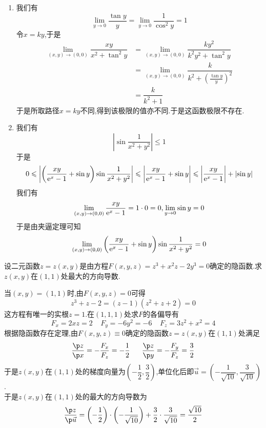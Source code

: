 \documentclass{ctexart}
\begin{document}
\begin{solution}
\begin{enumerate}[label=\tbf{(\arabic*)}]
        \item 我们有\[\lim_{y\to0}\dfrac{\tan y}{y}=\lim_{y\to0}\dfrac{1}{\cos^2y}=1\]令$x=ky$,于是
            \[\begin{aligned}
                \lim_{(x,y)\to(0,0)}\dfrac{xy}{x^2+\tan^2y}
                &= \lim_{(x,y)\to(0,0)}\dfrac{ky^2}{k^2y^2+\tan^2y} \\
                &= \lim_{(x,y)\to(0,0)}\dfrac{k}{k^2+\left(\frac{\tan y}{y}\right)^2} \\
                &= \dfrac{k}{k^2+1}
            \end{aligned}\]
            于是所取路径$x=ky$不同,得到该极限的值亦不同.于是这函数极限不存在.
        \item 我们有
            \[\left|\sin\dfrac{1}{x^2+y^2}\right|\leqslant 1\]
            于是
            \[0\leqslant\left|\left(\dfrac{xy}{\mathrm{e}^x-1}+\sin y\right)\sin\dfrac{1}{x^2+y^2}\right|\leqslant\left|\dfrac{xy}{\mathrm{e}^x-1}+\sin y\right|\leqslant\left|\dfrac{xy}{\mathrm{e}^x-1}\right|+\left|\sin y\right|\]
            我们有
            \[\lim_{(x,y)\to(0,0)}\dfrac{xy}{\mathrm{e}^x-1}=1\cdot0=0,\lim_{y\to0}\sin y=0\]
            于是由夹逼定理可知
            \[\lim_{(x,y)\to(0,0)}\left(\dfrac{xy}{\mathrm{e}^x-1}+\sin y\right)\sin\dfrac{1}{x^2+y^2}=0\]
    \end{enumerate}
\end{solution}
\begin{problem}[4.(10\songti{分})]
设二元函数$z=z(x,y)$是由方程$F(x,y,z)=z^3+x^2z-2y^3=0$确定的隐函数.求$z(x,y)$在$(1,1)$处最大的方向导数.
\end{problem}
\begin{solution}
当$(x,y)=(1,1)$时,由$F(x,y,z)=0$可得
    \[z^3+z-2=(z-1)(z^2+z+2)=0\]
    这方程有唯一的实根$z=1$.在$(1,1,1)$处求$F$的各偏导有
    \[F_x=2xz=2\ \ \ \ \ F_y=-6y^2=-6\ \ \ \ \ F_z=3z^2+x^2=4\]
    根据隐函数存在定理,由$F(x,y,z)\equiv0$确定的隐函数$z=z(x,y)$在$(1,1)$处满足
    \[\dfrac{\p z}{\p x}=-\dfrac{F_x}{F_z}=-\dfrac12\ \ \ \ \ \dfrac{\p z}{\p y}=-\dfrac{F_y}{F_z}=\dfrac32\]
    于是$z(x,y)$在$(1,1)$处的梯度向量为$\left(-\dfrac12,\dfrac32\right)$,单位化后即$\vec{u}=\left(-\dfrac{1}{\sqrt{10}},\dfrac{3}{\sqrt{10}}\right)$.\\
    于是$z(x,y)$在$(1,1)$处的最大的方向导数为
    \[\dfrac{\p z}{\p \vec{u}}=\left(-\dfrac12\right)\cdot\left(-\dfrac{1}{\sqrt{10}}\right)+\dfrac{3}{2}\cdot\dfrac{3}{\sqrt{10}}=\dfrac{\sqrt{10}}{2}\]
\end{solution}
\end{document}
